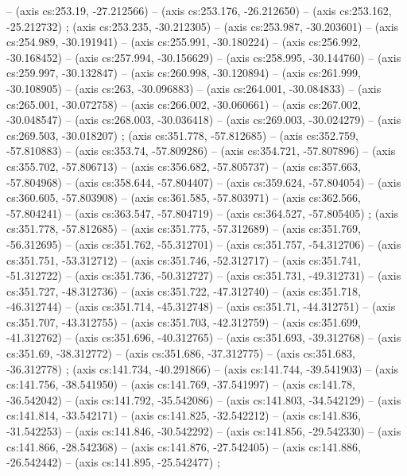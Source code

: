   -- (axis cs:253.19, -27.212566) -- (axis cs:253.176, -26.212650) -- (axis
  cs:253.162, -25.212732) ;  (axis cs:253.235,
  -30.212305) -- (axis cs:253.987, -30.203601) -- (axis cs:254.989,
  -30.191941) -- (axis cs:255.991, -30.180224) -- (axis cs:256.992,
  -30.168452) -- (axis cs:257.994, -30.156629) -- (axis cs:258.995,
  -30.144760) -- (axis cs:259.997, -30.132847) -- (axis cs:260.998,
  -30.120894) -- (axis cs:261.999, -30.108905) -- (axis cs:263, -30.096883) --
  (axis cs:264.001, -30.084833) -- (axis cs:265.001, -30.072758) -- (axis
  cs:266.002, -30.060661) -- (axis cs:267.002, -30.048547) -- (axis
  cs:268.003, -30.036418) -- (axis cs:269.003, -30.024279) -- (axis
  cs:269.503, -30.018207) ;  (axis cs:351.778,
  -57.812685) -- (axis cs:352.759, -57.810883) -- (axis cs:353.74, -57.809286)
  -- (axis cs:354.721, -57.807896) -- (axis cs:355.702, -57.806713) -- (axis
  cs:356.682, -57.805737) -- (axis cs:357.663, -57.804968) -- (axis
  cs:358.644, -57.804407) -- (axis cs:359.624, -57.804054) -- (axis
  cs:360.605, -57.803908) -- (axis cs:361.585, -57.803971) -- (axis
  cs:362.566, -57.804241) -- (axis cs:363.547, -57.804719) -- (axis
  cs:364.527, -57.805405) ;  (axis cs:351.778,
  -57.812685) -- (axis cs:351.775, -57.312689) -- (axis cs:351.769,
  -56.312695) -- (axis cs:351.762, -55.312701) -- (axis cs:351.757,
  -54.312706) -- (axis cs:351.751, -53.312712) -- (axis cs:351.746,
  -52.312717) -- (axis cs:351.741, -51.312722) -- (axis cs:351.736,
  -50.312727) -- (axis cs:351.731, -49.312731) -- (axis cs:351.727,
  -48.312736) -- (axis cs:351.722, -47.312740) -- (axis cs:351.718,
  -46.312744) -- (axis cs:351.714, -45.312748) -- (axis cs:351.71, -44.312751)
  -- (axis cs:351.707, -43.312755) -- (axis cs:351.703, -42.312759) -- (axis
  cs:351.699, -41.312762) -- (axis cs:351.696, -40.312765) -- (axis
  cs:351.693, -39.312768) -- (axis cs:351.69, -38.312772) -- (axis cs:351.686,
  -37.312775) -- (axis cs:351.683, -36.312778) ; 
  (axis cs:141.734, -40.291866) -- (axis cs:141.744, -39.541903) -- (axis
  cs:141.756, -38.541950) -- (axis cs:141.769, -37.541997) -- (axis cs:141.78,
  -36.542042) -- (axis cs:141.792, -35.542086) -- (axis cs:141.803,
  -34.542129) -- (axis cs:141.814, -33.542171) -- (axis cs:141.825,
  -32.542212) -- (axis cs:141.836, -31.542253) -- (axis cs:141.846,
  -30.542292) -- (axis cs:141.856, -29.542330) -- (axis cs:141.866,
  -28.542368) -- (axis cs:141.876, -27.542405) -- (axis cs:141.886,
  -26.542442) -- (axis cs:141.895, -25.542477) ; 

